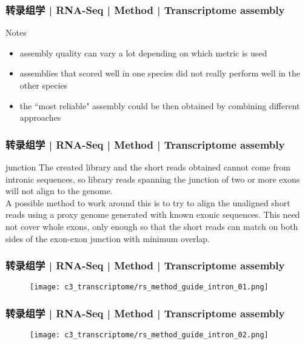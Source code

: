 \begin{frame}
  \frametitle{转录组学 | RNA-Seq | Method | Transcriptome assembly}
  \begin{block}{Notes}
    \begin{itemize}
      \item assembly quality can vary a lot depending on which metric is used
      \item assemblies that scored well in one species did not really perform well in the other species
      \item the ``most reliable" assembly could be then obtained by combining different approaches
    \end{itemize}
  \end{block}
\end{frame}

\begin{frame}
  \frametitle{转录组学 | RNA-Seq | Method | Transcriptome assembly}
  \begin{block}{junction}
 The created library and the short reads obtained cannot come from intronic sequences, so library reads spanning the junction of two or more exons will not align to the genome.\\
 \vspace{1em}
 A possible method to work around this is to try to align the unaligned short reads using a proxy genome generated with known exonic sequences. This need not cover whole exons, only enough so that the short reads can match on both sides of the exon-exon junction with minimum overlap.
  \end{block}
\end{frame}

\begin{frame}
  \frametitle{转录组学 | RNA-Seq | Method | Transcriptome assembly}
  \begin{figure}
    \centering
    \texttt{[image: c3\_transcriptome/rs\_method\_guide\_intron\_01.png]}
  \end{figure}
\end{frame}

\begin{frame}
  \frametitle{转录组学 | RNA-Seq | Method | Transcriptome assembly}
  \begin{figure}
    \centering
    \texttt{[image: c3\_transcriptome/rs\_method\_guide\_intron\_02.png]}
  \end{figure}
\end{frame}

